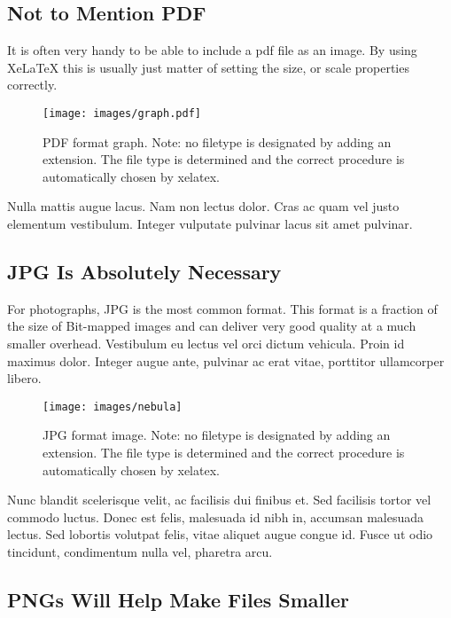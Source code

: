 \subsection{Not to Mention PDF}

It is often very handy to be able to include a pdf file as an image. By using XeLaTeX this is usually just matter of setting the size, or scale properties correctly.

\begin{figure}[htbp]
  \centering
    \texttt{[image: images/graph.pdf]}
    \caption[PDF format graph. Note: no filetype is designated by adding an extension.]{PDF format graph. Note: no filetype is designated by adding an extension. The file type is determined and the correct procedure is automatically chosen by xelatex.}
\end{figure}

Nulla mattis augue lacus. Nam non lectus dolor. Cras ac quam vel justo elementum vestibulum. Integer vulputate pulvinar lacus sit amet pulvinar.

\subsection{JPG Is Absolutely Necessary}

For photographs, JPG is the most common format. This format is a fraction of the size of Bit-mapped images and can deliver very good quality at a much smaller overhead. Vestibulum eu lectus vel orci dictum vehicula. Proin id maximus dolor. Integer augue ante, pulvinar ac erat vitae, porttitor ullamcorper libero. \cite{l2012wrinkle}

\begin{figure}[htbp]
  \centering
    \texttt{[image: images/nebula]}
    \caption[JPG format image. Note: no filetype is designated by adding an extension.]{JPG format image. Note: no filetype is designated by adding an extension. The file type is determined and the correct procedure is automatically chosen by xelatex.}
\end{figure}

Nunc blandit scelerisque velit, ac facilisis dui finibus et. Sed facilisis tortor vel commodo luctus. Donec est felis, malesuada id nibh in, accumsan malesuada lectus. Sed lobortis volutpat felis, vitae aliquet augue congue id. Fusce ut odio tincidunt, condimentum nulla vel, pharetra arcu.

\subsection{PNGs Will Help Make Files Smaller}

